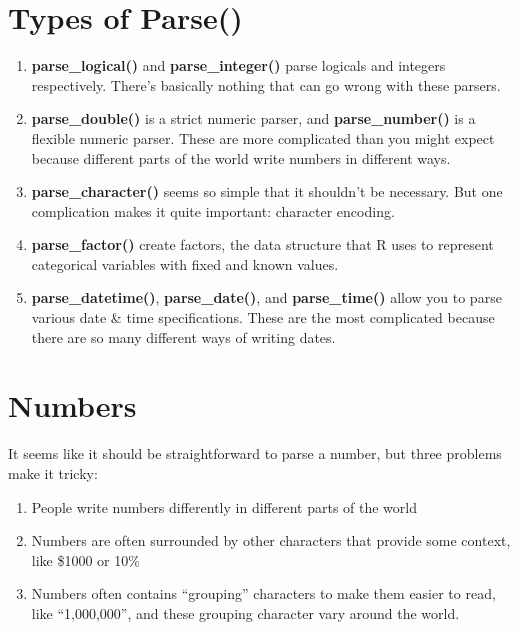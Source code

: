 \documentclass[
]{article}
\begin{document}
\hypertarget{types-of-parse}{%
\section{\texorpdfstring{\textbf{Types of
Parse()}}{Types of Parse()}}\label{types-of-parse}}

\begin{enumerate}
\def\labelenumi{\arabic{enumi}.}
\item
  \textbf{parse\_logical()} and \textbf{parse\_integer()} parse logicals
  and integers respectively. There's basically nothing that can go wrong
  with these parsers.
\item
  \textbf{parse\_double()} is a strict numeric parser, and
  \textbf{parse\_number()} is a flexible numeric parser. These are more
  complicated than you might expect because different parts of the world
  write numbers in different ways.
\item
  \textbf{parse\_character()} seems so simple that it shouldn't be
  necessary. But one complication makes it quite important: character
  encoding.
\item
  \textbf{parse\_factor()} create factors, the data structure that R
  uses to represent categorical variables with fixed and known values.
\item
  \textbf{parse\_datetime()}, \textbf{parse\_date()}, and
  \textbf{parse\_time()} allow you to parse various date \& time
  specifications. These are the most complicated because there are so
  many different ways of writing dates.
\end{enumerate}

\hypertarget{numbers}{%
\section{\texorpdfstring{\textbf{Numbers}}{Numbers}}\label{numbers}}

It seems like it should be straightforward to parse a number, but three
problems make it tricky:

\begin{enumerate}
\def\labelenumi{\arabic{enumi}.}
\item
  People write numbers differently in different parts of the world
\item
  Numbers are often surrounded by other characters that provide some
  context, like \$1000 or 10\%
\item
  Numbers often contains ``grouping'' characters to make them easier to
  read, like ``1,000,000'', and these grouping character vary around the
  world.
\end{enumerate}
\end{document}
